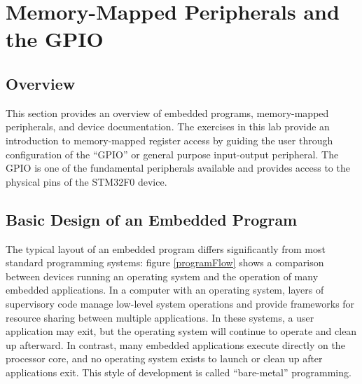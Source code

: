\documentclass[11pt,fleqn]{book} %
\begin{document}




\chapter{Memory-Mapped Peripherals and the GPIO}

\section{Overview}
This section provides an overview of embedded programs, memory-mapped peripherals, and device documentation. The exercises in this lab provide an introduction to memory-mapped register access by guiding the user through configuration of the ``GPIO'' or general purpose input-output peripheral. The GPIO is one of the fundamental peripherals available and provides access to the physical pins of the STM32F0 device. 


\section{Basic Design of an Embedded Program}


The typical layout of an embedded program differs significantly from most standard programming systems: figure \vref{programFlow} shows a comparison between devices running an operating system and the operation of many embedded applications. 
In a computer with an operating system, layers of supervisory code manage low-level system operations and provide frameworks for resource sharing between multiple applications. In these systems, a user application may exit, but the operating system will continue to operate and clean up afterward. In contrast, many embedded applications execute directly on the processor core, and no operating system exists to launch or clean up after applications exit. This style of development is called ``bare-metal'' programming. 
\end{document}
